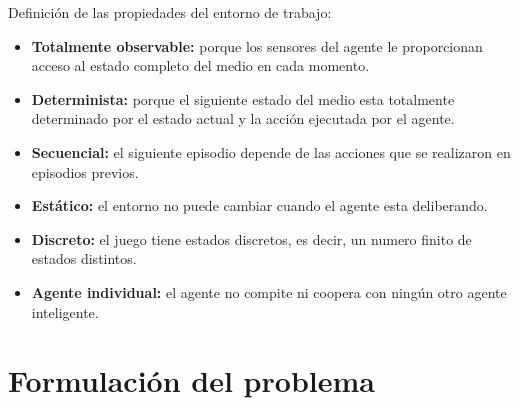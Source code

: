 \documentclass[onecolumn]{IEEEtran}
\begin{document}
Definición de las propiedades del entorno de trabajo:
\begin{itemize}
    \item \textbf{Totalmente observable:} porque los sensores del agente le proporcionan acceso al estado completo del medio en cada momento.
    \item \textbf{Determinista:} porque el siguiente estado del medio esta totalmente determinado por el estado actual y la acción ejecutada por el agente.
    \item \textbf{Secuencial:} el siguiente episodio depende de las acciones que se realizaron en episodios previos.
    \item \textbf{Estático:} el entorno no puede cambiar cuando el agente esta deliberando.
    \item \textbf{Discreto:} el juego tiene estados discretos, es decir, un numero finito de estados distintos.
    \item \textbf{Agente individual:} el agente no compite ni coopera con ningún otro agente inteligente.
\end{itemize}

\section{Formulación del problema}
\end{document}
